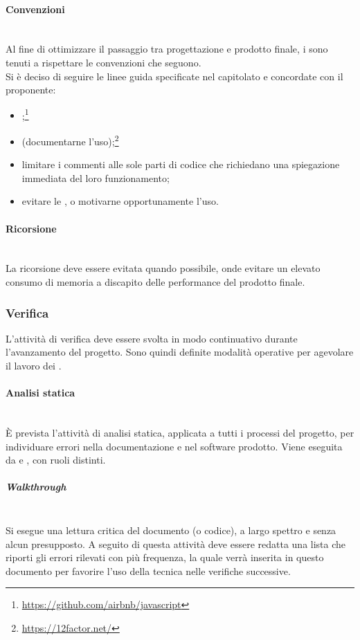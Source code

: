 \paragraph{Convenzioni} \label{sec:convenzioni}\mbox{}\\
Al fine di ottimizzare il passaggio tra progettazione e prodotto finale, i \Programmatori{} sono tenuti a rispettare le convenzioni che seguono.\\
Si è deciso di seguire le linee guida specificate nel capitolato e concordate con il proponente:
\begin{itemize}
	\item {};\footnote{\url{https://github.com/airbnb/javascript}}
	\item {} (documentarne l'uso);\footnote{\url{https://12factor.net/}}
	\item limitare i commenti alle sole parti di codice che richiedano una spiegazione immediata del loro funzionamento;
	\item evitare le , o motivarne opportunamente l’uso.
\end{itemize}
\paragraph{Ricorsione}\mbox{}\\
La ricorsione deve essere evitata quando possibile, onde evitare un elevato consumo di memoria a discapito delle performance del prodotto finale.

\subsubsection{Verifica}
L’attività di verifica deve essere svolta in modo continuativo durante l'avanzamento del progetto. Sono quindi definite modalità operative per agevolare il lavoro dei \Verificatori.

\paragraph{Analisi statica}\mbox{}\\
\`{E} prevista l'attività di analisi statica, applicata a tutti i processi del progetto, per individuare errori nella documentazione e nel software prodotto. Viene eseguita da \Verificatori{} e \Programmatori{}, con ruoli distinti.

\subparagraph{Walkthrough} \mbox{}\\
Si esegue una lettura critica del documento (o codice), a largo spettro e senza alcun presupposto. A seguito di questa attività deve essere redatta una lista che riporti gli errori rilevati con più frequenza, la quale verrà inserita in questo documento per favorire l'uso della tecnica  nelle verifiche successive.


